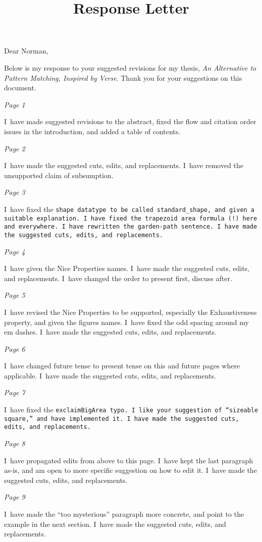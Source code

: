 \documentclass[manuscript,screen, 12pt, nonacm]{acmart}
\title{Response Letter}
\begin{document}
Dear Norman, 

Below is my response to your suggested revisions for my thesis, \textit{An
Alternative to Pattern Matching, Inspired by Verse}. Thank you for your
suggestions on this document. 

\bigskip

\it{Page 1}

I~have made suggested revisions to the abstract, fixed the flow and citation
order issues in the introduction, and added a table of contents. 

\it{Page 2}

I~have made the suggested cuts, edits, and replacements. I~have removed the
unsupported claim of subsumption. 

\it{Page 3}

I~have fixed the \tt{shape} datatype to be called \tt{standard\_shape}, and
given a suitable explanation. I~have fixed the trapezoid area formula (!) here
and everywhere. I~have rewritten the garden-path sentence. I~have made the
suggested cuts, edits, and replacements.

\it{Page 4}

I~have given the Nice Properties names. I~have made the suggested cuts, edits,
and replacements. I~have changed the order to present first, discuss after. 

\it{Page 5}

I~have revised the Nice Properties to be supported, especially the
Exhaustiveness property, and given the figures names. I~have fixed the odd
spacing around my em dashes. I~have made the suggested cuts, edits, and
replacements.

\it{Page 6}

I~have changed future tense to present tense on this and future pages where
applicable. I~have made the suggested cuts, edits, and replacements.

\it{Page 7}

I~have fixed the \tt{exclaimBigArea} typo. I~like your suggestion of “sizeable
square,” and have implemented it. I~have made the suggested cuts, edits, and
replacements. 

\it{Page 8}

I~have propagated edits from above to this page. I~have kept the last paragraph
as-is, and am open to more specific suggestion on how to edit it. I~have made
the suggested cuts, edits, and replacements. 

\it{Page 9}

I~have made the “too mysterious” paragraph more concrete, and point to the
example in the next section. I~have made the suggested cuts, edits, and
replacements. 
\end{document}
